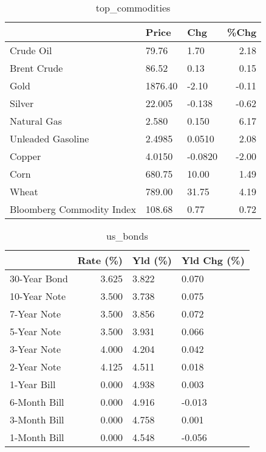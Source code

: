 \documentclass{article}%
\begin{document}
\begin{table}[htbp]%
\caption{top\_commodities}%
\centering%
\begin{adjustbox}{width=1\textwidth}%
\begin{tabular}{lllr}
\toprule
                          &   Price &     Chg &  \%Chg \\
\midrule
               Crude Oil  &   79.76 &    1.70 &  2.18 \\
             Brent Crude  &   86.52 &    0.13 &  0.15 \\
                    Gold  & 1876.40 &   -2.10 & -0.11 \\
                  Silver  &  22.005 &  -0.138 & -0.62 \\
             Natural Gas  &   2.580 &   0.150 &  6.17 \\
       Unleaded Gasoline  &  2.4985 &  0.0510 &  2.08 \\
                  Copper  &  4.0150 & -0.0820 & -2.00 \\
                    Corn  &  680.75 &   10.00 &  1.49 \\
                   Wheat  &  789.00 &   31.75 &  4.19 \\
Bloomberg Commodity Index &  108.68 &    0.77 &  0.72 \\
\bottomrule
\end{tabular}
%
\end{adjustbox}%
\end{table}

%


\begin{table}[htbp]%
\caption{us\_bonds}%
\centering%
\begin{adjustbox}{width=1\textwidth}%
\begin{tabular}{lrll}
\toprule
             &  Rate (\%) & Yld (\%) & Yld Chg (\%) \\
\midrule
30-Year Bond &     3.625 &   3.822 &       0.070 \\
10-Year Note &     3.500 &   3.738 &       0.075 \\
 7-Year Note &     3.500 &   3.856 &       0.072 \\
 5-Year Note &     3.500 &   3.931 &       0.066 \\
 3-Year Note &     4.000 &   4.204 &       0.042 \\
 2-Year Note &     4.125 &   4.511 &       0.018 \\
 1-Year Bill &     0.000 &   4.938 &       0.003 \\
6-Month Bill &     0.000 &   4.916 &      -0.013 \\
3-Month Bill &     0.000 &   4.758 &       0.001 \\
1-Month Bill &     0.000 &   4.548 &      -0.056 \\
\bottomrule
\end{tabular}
%
\end{adjustbox}%
\end{table}
\end{document}
